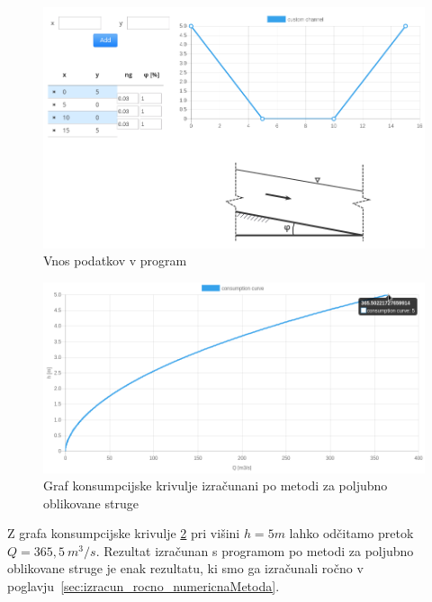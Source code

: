 \begin{figure}[H]
	\begin{centering}
		\includegraphics[width=\textwidth]{slike/izracuni/numericno_modeliranjeStruge.png}\caption{Vnos podatkov v program}\label{fig:modeliranjeStruge}
	\end{centering}
\end{figure}

\begin{figure}[H]
	\begin{centering}
		\includegraphics[width=\textwidth]{slike/izracuni/numericno_konsumpcijskaKrivulja.png}\caption{Graf konsumpcijske krivulje izračunani po metodi za poljubno oblikovane struge}\label{fig:custom_konsumpcijskaKrivulja}
	\end{centering}
\end{figure}


Z grafa konsumpcijske krivulje \ref{fig:custom_konsumpcijskaKrivulja} pri višini $h = 5m$ lahko odčitamo pretok $Q=365,5~m^3/s$. Rezultat izračunan s programom po metodi za poljubno oblikovane struge je enak rezultatu, ki smo ga izračunali ročno v poglavju~\ref{sec:izracun_rocno_numericnaMetoda}.





